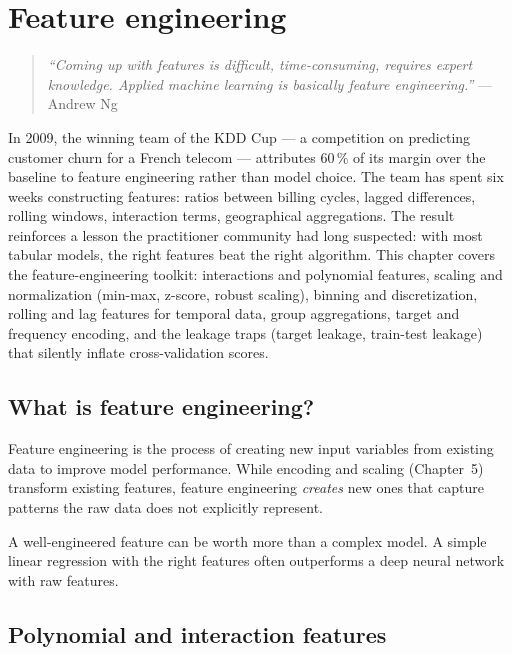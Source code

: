 \chapter{Feature engineering}
\label{ch:feature-engineering}

\begin{quote}
\emph{``Coming up with features is difficult, time-consuming, requires expert knowledge. Applied machine learning is basically feature engineering.''}
--- Andrew Ng
\end{quote}

In 2009, the winning team of the KDD Cup --- a competition on predicting customer churn for a French telecom --- attributes 60\,\% of its margin over the baseline to feature engineering rather than model choice. The team has spent six weeks constructing features: ratios between billing cycles, lagged differences, rolling windows, interaction terms, geographical aggregations. The result reinforces a lesson the practitioner community had long suspected: with most tabular models, the right features beat the right algorithm. This chapter covers the feature-engineering toolkit: interactions and polynomial features, scaling and normalization (min-max, z-score, robust scaling), binning and discretization, rolling and lag features for temporal data, group aggregations, target and frequency encoding, and the leakage traps (target leakage, train-test leakage) that silently inflate cross-validation scores.

\section{What is feature engineering?}

Feature engineering is the process of creating new input variables from existing data to improve model performance. While encoding and scaling (Chapter~5) transform existing features, feature engineering \emph{creates} new ones that capture patterns the raw data does not explicitly represent.

\begin{datatip}
A well-engineered feature can be worth more than a complex model. A simple linear regression with the right features often outperforms a deep neural network with raw features.
\end{datatip}

\section{Polynomial and interaction features}

